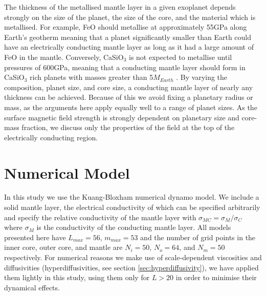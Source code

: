 The thickness of the metallised mantle layer in a given exoplanet depends strongly on the size of the planet, the size of the core, and the material which is metallised. For example, FeO should metallise at approximately 55GPa along Earth's geotherm \citep{ohta2012} meaning that a planet significantly smaller than Earth could have an electrically conducting mantle layer as long as it had a large amount of FeO in the mantle. Conversely, CaSiO$_{3}$ is not expected to metallise until pressures of 600GPa, meaning that a conducting mantle layer should form in CaSiO$_{3}$ rich planets with masses greater than 5$M_{Earth}$ \citep{tsuchiya2011}. By varying the composition, planet size, and core size, a conducting mantle layer of nearly any thickness can be achieved. Because of this we avoid fixing a planetary radius or mass, as the arguments here apply equally well to a range of planet sizes. As the surface magnetic field strength is strongly dependent on planetary size and core-mass fraction, we discuss only the properties of the field at the top of the electrically conducting region.
 
\section{Numerical Model}
In this study we use the Kuang-Bloxham numerical dynamo model. We include a solid mantle layer, the electrical conductivity of which can be specified arbitrarily and specify the relative conductivity of the mantle layer with $\sigma_{MC}=\sigma_{M}/\sigma_{C}$ where $\sigma_{M}$ is the conductivity of the conducting mantle layer. All models presented here have $L_{max}=56$, $m_{max}=53$ and the number of grid points in the inner core, outer core, and mantle are $N_{i}=50$, $N_{o}=64$, and $N_{m}=50$ respectively. For numerical reasons we make use of scale-dependent viscosities and diffusivities (hyperdiffusivities, see section \ref{sec:hyperdiffusivity}), we have applied them lightly in this study, using them only for $L>20$ in order to minimise their dynamical effects.

